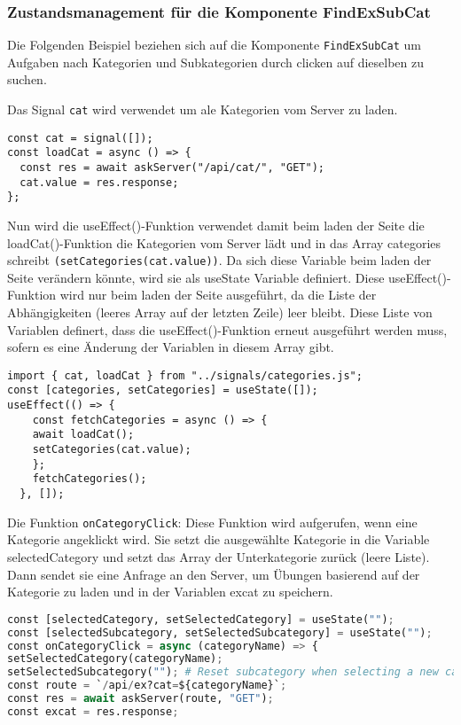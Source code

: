 \subsubsection{Zustandsmanagement für die Komponente FindExSubCat } 
Die Folgenden Beispiel beziehen sich auf die Komponente \texttt{FindExSubCat} um Aufgaben nach Kategorien und Subkategorien durch clicken auf dieselben zu suchen.

Das Signal \texttt{cat} wird verwendet um ale Kategorien vom Server zu laden.

\begin{lstlisting}
const cat = signal([]);
const loadCat = async () => {
  const res = await askServer("/api/cat/", "GET");
  cat.value = res.response;
};

\end{lstlisting}

Nun wird die useEffect()-Funktion verwendet damit beim laden der Seite die loadCat()-Funktion die Kategorien vom Server lädt und in das Array categories schreibt \texttt{(setCategories(cat.value))}. Da sich diese Variable beim laden der Seite verändern könnte, wird sie als useState Variable definiert. 
Diese useEffect()-Funktion wird nur beim laden der Seite ausgeführt, da die Liste der Abhängigkeiten (leeres Array auf der letzten Zeile) leer bleibt. Diese Liste von Variablen definert, dass die useEffect()-Funktion erneut ausgeführt werden muss, sofern es eine Änderung der Variablen in diesem Array gibt.

\begin{lstlisting}
import { cat, loadCat } from "../signals/categories.js";
const [categories, setCategories] = useState([]);
useEffect(() => {
    const fetchCategories = async () => {
    await loadCat();
    setCategories(cat.value);
    };
    fetchCategories();
  }, []);

\end{lstlisting}




Die Funktion \texttt{onCategoryClick}: Diese Funktion wird aufgerufen, wenn eine Kategorie angeklickt wird. Sie setzt die ausgewählte Kategorie in die Variable selectedCategory und setzt das Array der Unterkategorie zurück (leere Liste). Dann sendet sie eine Anfrage an den Server, um Übungen basierend auf der Kategorie zu laden und in der Variablen excat zu speichern.

\begin{lstlisting}[language=Python]
const [selectedCategory, setSelectedCategory] = useState("");
const [selectedSubcategory, setSelectedSubcategory] = useState("");
const onCategoryClick = async (categoryName) => {
setSelectedCategory(categoryName);
setSelectedSubcategory(""); # Reset subcategory when selecting a new category
const route = `/api/ex?cat=${categoryName}`;
const res = await askServer(route, "GET");
const excat = res.response;
    
\end{lstlisting}

